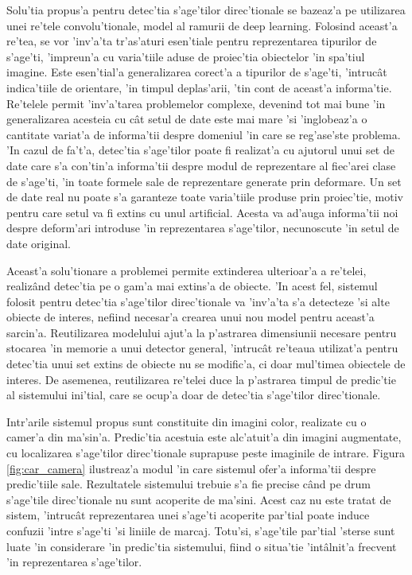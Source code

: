 \documentclass[12pt,a4paper,twoside]{report}
\begin{document}
Solu'tia propus'a pentru detec'tia s'age'tilor direc'tionale se bazeaz'a pe utilizarea unei re'tele convolu'tionale, model al ramurii de deep learning. Folosind aceast'a re'tea, se vor 'inv'a'ta tr'as'aturi esen'tiale pentru reprezentarea tipurilor de s'age'ti, 'impreun'a cu varia'tiile aduse de proiec'tia obiectelor 'in spa'tiul imagine. Este esen'tial'a generalizarea corect'a a tipurilor de s'age'ti, 'intruc\^at indica'tiile de orientare, 'in timpul deplas'arii, 'tin cont de aceast'a informa'tie. Re'telele permit 'inv'a'tarea problemelor complexe, devenind tot mai bune 'in generalizarea acesteia cu c\^at setul de date este mai mare 'si 'inglobeaz'a o cantitate variat'a de informa'tii despre domeniul 'in care se reg'ase'ste problema. 'In cazul de fa't'a, detec'tia s'age'tilor poate fi realizat'a cu ajutorul unui set de date care s'a con'tin'a informa'tii despre modul de reprezentare al fiec'arei clase de s'age'ti, 'in toate formele sale de reprezentare generate prin deformare. Un set de date real nu poate s'a garanteze toate varia'tiile produse prin proiec'tie, motiv pentru care setul va fi extins cu unul artificial. Acesta va ad'auga informa'tii noi despre deform'ari introduse 'in reprezentarea s'age'tilor, necunoscute 'in setul de date original.

Aceast'a solu'tionare a problemei permite extinderea ulterioar'a a re'telei, realiz\^and detec'tia pe o gam'a mai extins'a de obiecte. 'In acest fel, sistemul folosit pentru detec'tia s'age'tilor direc'tionale va 'inv'a'ta s'a detecteze 'si alte obiecte de interes, nefiind necesar'a crearea unui nou model pentru aceast'a sarcin'a. Reutilizarea modelului ajut'a la p'astrarea dimensiunii necesare pentru stocarea 'in memorie a unui detector general, 'intruc\^at re'teaua utilizat'a pentru detec'tia unui set extins de obiecte nu se modific'a, ci doar mul'timea obiectele de interes. De asemenea, reutilizarea re'telei duce la p'astrarea timpul de predic'tie al sistemului ini'tial, care se ocup'a doar de detec'tia s'age'tilor direc'tionale.

Intr'arile sistemul propus sunt constituite din imagini color, realizate cu o camer'a din ma'sin'a. Predic'tia acestuia este alc'atuit'a din imagini augmentate, cu localizarea s'age'tilor direc'tionale suprapuse peste imaginile de intrare. Figura \ref{fig:car_camera} ilustreaz'a modul 'in care sistemul ofer'a informa'tii despre predic'tiile sale. Rezultatele sistemului trebuie s'a fie precise c\^and pe drum s'age'tile direc'tionale nu sunt acoperite de ma'sini. Acest caz nu este tratat de sistem, 'intruc\^at reprezentarea unei s'age'ti acoperite par'tial poate induce confuzii 'intre s'age'ti 'si liniile de marcaj. Totu'si, s'age'tile par'tial 'sterse sunt luate 'in considerare 'in predic'tia sistemului, fiind o situa'tie 'int\^alnit'a frecvent 'in reprezentarea s'age'tilor. 
\end{document}
